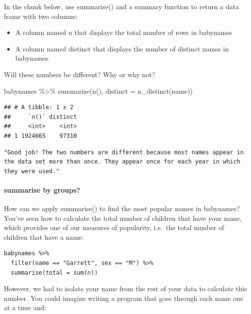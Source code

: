\documentclass[
]{article}
\newenvironment{Shaded}{\begin{snugshade}}{\end{snugshade}}
\newcommand{\AttributeTok}[1]{\textcolor[rgb]{0.77,0.63,0.00}{#1}}
\newcommand{\FunctionTok}[1]{\textcolor[rgb]{0.00,0.00,0.00}{#1}}
\newcommand{\NormalTok}[1]{#1}
\newcommand{\SpecialCharTok}[1]{\textcolor[rgb]{0.00,0.00,0.00}{#1}}
\providecommand{\tightlist}{%
  \setlength{\itemsep}{0pt}\setlength{\parskip}{0pt}}
\begin{document}
In the chunk below, use summarise() and a summary function to return a
data frame with two columns:

\begin{itemize}
\tightlist
\item
  A column named n that displays the total number of rows in babynames
\item
  A column named distinct that displays the number of distinct names in
  babynames
\end{itemize}

Will these numbers be different? Why or why not?

\begin{Shaded}
\begin{Highlighting}[]
\NormalTok{babynames }\SpecialCharTok{\%\textgreater{}\%} 
   \FunctionTok{summarize}\NormalTok{(}\FunctionTok{n}\NormalTok{(), }\AttributeTok{distinct =} \FunctionTok{n\_distinct}\NormalTok{(name))}
\end{Highlighting}
\end{Shaded}

\begin{verbatim}
## # A tibble: 1 x 2
##     `n()` distinct
##     <int>    <int>
## 1 1924665    97310
\end{verbatim}

\begin{verbatim}
"Good job! The two numbers are different because most names appear in the data set more than once. They appear once for each year in which they were used."
\end{verbatim}

\hypertarget{summarise-by-groups}{%
\paragraph{summarise by groups?}\label{summarise-by-groups}}

How can we apply summarise() to find the most popular names in
babynames? You've seen how to calculate the total number of children
that have your name, which provides one of our measures of popularity,
i.e.~the total number of children that have a name:

\begin{verbatim}
babynames %>% 
  filter(name == "Garrett", sex == "M") %>% 
  summarise(total = sum(n))
\end{verbatim}

However, we had to isolate your name from the rest of your data to
calculate this number. You could imagine writing a program that goes
through each name one at a time and:
\end{document}
